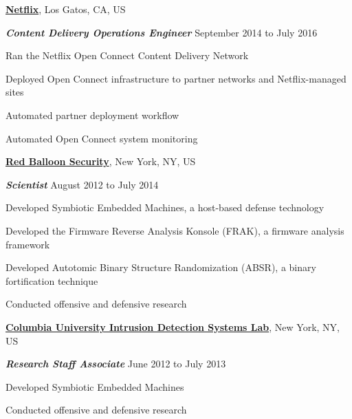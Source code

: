 \documentclass[10pt]{article}
\newenvironment{outerlist}[1][\enskip\textbullet]%
        {\begin{itemize}[#1]}{\end{itemize}%
         \vspace{-.6\baselineskip}}
\newenvironment{innerlist}[1][\enskip\textbullet]%
        {\begin{compactitem}[#1]}{\end{compactitem}}
\newcommand{\blankline}{\quad\pagebreak[2]}
\begin{document}
\blankline

\href{https://openconnect.netflix.com/}{\textbf{Netflix}},
Los Gatos, CA, US
\begin{outerlist}
\item[] \textit{\textbf{Content Delivery Operations Engineer}}
  \hfill September 2014 to July 2016
  \begin{innerlist}
  \item Ran the Netflix Open Connect Content Delivery Network
  \item Deployed Open Connect infrastructure to partner networks and Netflix-managed sites
  \item Automated partner deployment workflow
  \item Automated Open Connect system monitoring
  \end{innerlist}
\end{outerlist}

\blankline

\href{http://www.redballoonsecurity.com/}{\textbf{Red Balloon Security}},
New York, NY, US
\begin{outerlist}
\item[] \textit{\textbf{Scientist}}
  \hfill August 2012 to July 2014
  \begin{innerlist}
  \item Developed Symbiotic Embedded Machines, a host-based defense technology
  \item Developed the Firmware Reverse Analysis Konsole (FRAK), a firmware analysis framework
  \item Developed Autotomic Binary Structure Randomization (ABSR), a binary fortification technique
  \item Conducted offensive and defensive research
  \end{innerlist}
\end{outerlist}

\blankline

\href{http://www.hacktory.cs.columbia.edu/}{\textbf{Columbia University Intrusion Detection Systems Lab}},
New York, NY, US
\begin{outerlist}
\item[] \textit{\textbf{Research Staff Associate}}
  \hfill June 2012 to July 2013
  \begin{innerlist}
  \item Developed Symbiotic Embedded Machines
  \item Conducted offensive and defensive research
  \end{innerlist}
\end{outerlist}
\end{document}
